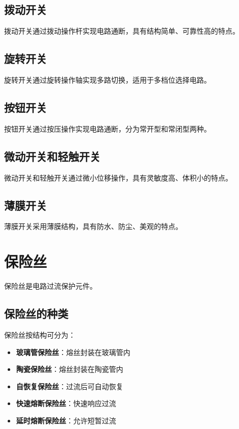 \documentclass[12pt,UTF8]{ctexbook}
\begin{document}
\subsection{拨动开关}

拨动开关通过拨动操作杆实现电路通断，具有结构简单、可靠性高的特点。

\subsection{旋转开关}

旋转开关通过旋转操作轴实现多路切换，适用于多档位选择电路。

\subsection{按钮开关}

按钮开关通过按压操作实现电路通断，分为常开型和常闭型两种。

\subsection{微动开关和轻触开关}

微动开关和轻触开关通过微小位移操作，具有灵敏度高、体积小的特点。

\subsection{薄膜开关}

薄膜开关采用薄膜结构，具有防水、防尘、美观的特点。

\section{保险丝}

保险丝是电路过流保护元件。

\subsection{保险丝的种类}

保险丝按结构可分为：

\begin{itemize}[leftmargin=2cm]
	\item \textbf{玻璃管保险丝}：熔丝封装在玻璃管内
	\item \textbf{陶瓷保险丝}：熔丝封装在陶瓷管内
	\item \textbf{自恢复保险丝}：过流后可自动恢复
	\item \textbf{快速熔断保险丝}：快速响应过流
	\item \textbf{延时熔断保险丝}：允许短暂过流
\end{itemize}
\end{document}
